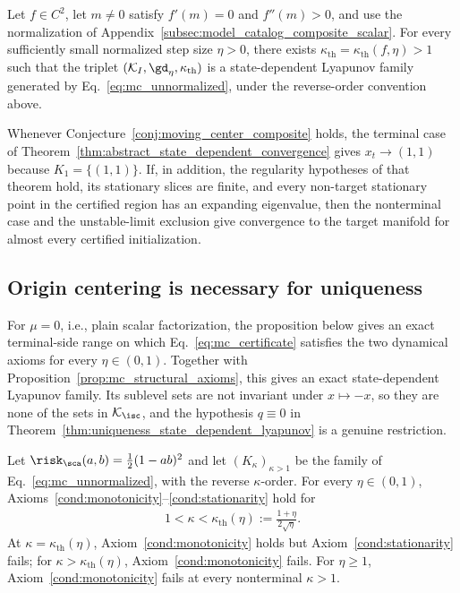 \documentclass{article}
\begin{document}
\begin{conjecture}
\label{conj:moving_center_composite}
Let $f\in C^2$, let $m\ne0$ satisfy $f'(m)=0$ and $f''(m)>0$, and use the
normalization of
Appendix~\ref{subsec:model_catalog_composite_scalar}.
For every sufficiently small normalized step size $\eta>0$, there exists
$\kappa_{\mathrm{th}}=\kappa_{\mathrm{th}}(f,\eta)>1$ such that the triplet
$(\mathcal K_I,\gd_\eta,\kappa_{\mathrm{th}})$ is a state-dependent Lyapunov
family generated by Eq.~\eqref{eq:mc_unnormalized}, under the reverse-order
convention above.
\end{conjecture}

Whenever Conjecture~\ref{conj:moving_center_composite} holds, the terminal
case of Theorem~\ref{thm:abstract_state_dependent_convergence} gives
$x_t\to(1,1)$ because $K_1=\{(1,1)\}$. If, in addition, the regularity
hypotheses of that theorem hold, its stationary slices are finite, and every
non-target stationary point in the certified region has an expanding
eigenvalue, then the nonterminal case and the unstable-limit exclusion give
convergence to the target manifold for almost every certified initialization.

\subsection{Origin centering is necessary for uniqueness}
\label{subsec:moving_center_sharpness}

For $\mu=0$, i.e., plain scalar factorization, the proposition below gives an
exact terminal-side range on which Eq.~\eqref{eq:mc_certificate} satisfies the
two dynamical axioms for every $\eta\in(0,1)$. Together with
Proposition~\ref{prop:mc_structural_axioms}, this gives an exact
state-dependent Lyapunov family. Its sublevel sets are not invariant under
$x\mapsto-x$, so they are none of the sets in $\mathcal K_{\isc}$, and the
hypothesis $q\equiv0$ in
Theorem~\ref{thm:uniqueness_state_dependent_lyapunov} is a genuine restriction.

\begin{proposition}
\label{prop:mc_axioms_mu0}
Let $\risk_\sca(a,b)=\tfrac12(1-ab)^2$ and let $(K_\kappa)_{\kappa>1}$ be the
family of Eq.~\eqref{eq:mc_unnormalized}, with the reverse $\kappa$-order.
For every $\eta\in(0,1)$,
Axioms~\ref{cond:monotonicity}--\ref{cond:stationarity} hold for
\begin{align}
    1<\kappa<\kappa_{\mathrm{th}}(\eta)
    :=\frac{1+\eta}{2\sqrt{\eta}}.
    \label{eq:mc_exact_threshold}
\end{align}
At $\kappa=\kappa_{\mathrm{th}}(\eta)$,
Axiom~\ref{cond:monotonicity} holds but Axiom~\ref{cond:stationarity} fails;
for $\kappa>\kappa_{\mathrm{th}}(\eta)$,
Axiom~\ref{cond:monotonicity} fails.
For $\eta\ge1$, Axiom~\ref{cond:monotonicity} fails at every nonterminal
$\kappa>1$.
\end{proposition}
\end{document}
